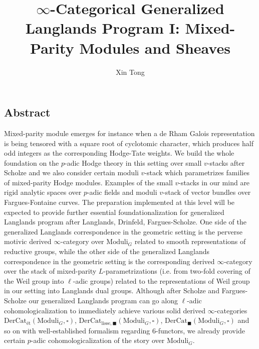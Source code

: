 \documentclass[12pt]{book}
\title{$\infty$-Categorical Generalized Langlands Program I: Mixed-Parity Modules and Sheaves}
\author{Xin Tong}
\date{}
\theoremstyle{definition}
\begin{document}
\maketitle



\newpage
\subsection*{Abstract}
Mixed-parity module emerges for instance when a de Rham Galois representation is being tensored with a square root of cyclotomic character, which produces half odd integers as the corresponding Hodge-Tate weights. We build the whole foundation on the $p$-adic Hodge theory in this setting over small $v$-stacks after Scholze and we also consider certain moduli $v$-stack which parametrizes families of mixed-parity Hodge modules. Examples of the small $v$-stacks in our mind are rigid analytic spaces over $p$-adic fields and moduli $v$-stack of vector bundles over Fargues-Fontaine curves. The preparation implemented at this level will be expected to provide further essential foundationalization for generalized Langlands program after Langlands, Drinfeld, Fargues-Scholze. One side of the generalized Langlands correspondence in the geometric setting is the perverse motivic derived $\infty$-category over $\mathrm{Moduli}_G$ related to smooth representations of reductive groups, while the other side of the generalized Langlands correspondence in the geometric setting is the corresponding derived $\infty$-category over the stack of mixed-parity $L$-parametrizations (i.e. from two-fold covering of the Weil group into $\ell$-adic groups) related to the representations of Weil group in our setting into Langlands dual groups. Although after Scholze and Fargues-Scholze our generalized Langlands program can go along $\ell$-adic cohomologicalization to immediately achieve various solid derived $\infty$-categories $\mathrm{DerCat}_\text{\'et}(\mathrm{Moduli}_G,\square)$, $\mathrm{DerCat}_\mathrm{lisse, \blacksquare}(\mathrm{Moduli}_G,\square)$, $\mathrm{DerCat}_{\blacksquare}(\mathrm{Moduli}_G,\square)$ and so on with well-established formalism regarding 6-functors, we already provide certain $p$-adic cohomologicalization of the story over $\mathrm{Moduli}_G$.



\newpage
\tableofcontents

\newpage
\end{document}
